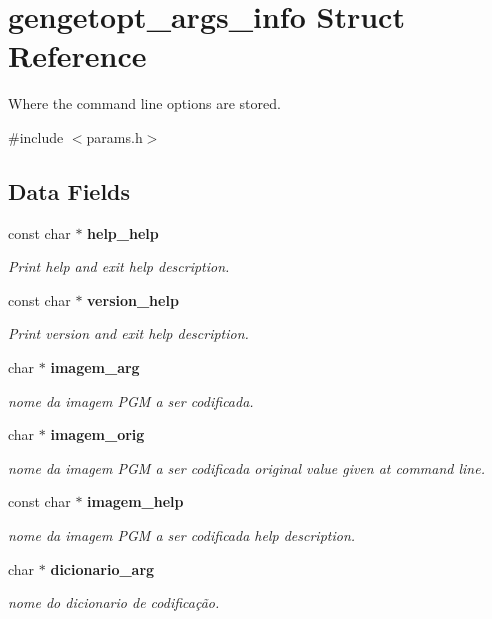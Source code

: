 \section{gengetopt\_\-args\_\-info Struct Reference}
\label{da/dad/structgengetopt__args__info}


Where the command line options are stored.  




{\ttfamily \#include $<$params.h$>$}

\subsection*{Data Fields}
\begin{DoxyCompactItemize}
\item 
const char $\ast$ {\bf help\_\-help}
\begin{DoxyCompactList}\small\item\em Print help and exit help description. \end{DoxyCompactList}\item 
const char $\ast$ {\bf version\_\-help}
\begin{DoxyCompactList}\small\item\em Print version and exit help description. \end{DoxyCompactList}\item 
char $\ast$ {\bf imagem\_\-arg}
\begin{DoxyCompactList}\small\item\em nome da imagem PGM a ser codificada. \end{DoxyCompactList}\item 
char $\ast$ {\bf imagem\_\-orig}
\begin{DoxyCompactList}\small\item\em nome da imagem PGM a ser codificada original value given at command line. \end{DoxyCompactList}\item 
const char $\ast$ {\bf imagem\_\-help}
\begin{DoxyCompactList}\small\item\em nome da imagem PGM a ser codificada help description. \end{DoxyCompactList}\item 
char $\ast$ {\bf dicionario\_\-arg}
\begin{DoxyCompactList}\small\item\em nome do dicionario de codificação. \end{DoxyCompactList}\item 

\end{DoxyCompactItemize}
